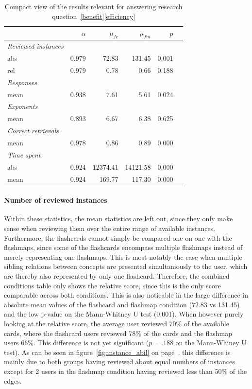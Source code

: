\begin{table}
    \centering
    \begin{tabular}{lrrrrr}
        \toprule
        & $\alpha$ & $\mu_{fc}$ & $\mu_{fm}$ & $p$ \\
        \midrule
        \emph{Reviewed instances} &&&& \\
        \midrule
        abs & 0.979 & 72.83 & 131.45 & 0.001 \\
        rel & 0.979 & 0.78 & 0.66 & 0.188 \\
        \midrule
        \emph{Responses} &&&& \\
        \midrule
        mean & 0.938 & 7.61 & 5.61 & 0.024 \\
        \midrule
        \multicolumn{5}{l}{\emph{Exponents}} \\
        \midrule
        mean & 0.893 & 6.67 & 6.38 & 0.625 \\
        \midrule
        \emph{Correct retrievals} &&&& \\
        \midrule
        mean & 0.978 & 0.86 & 0.89 & 0.000 \\
        \midrule
        \emph{Time spent} &&&& \\
        \midrule
        abs & 0.924 & 12374.41 & 14121.58 & 0.000 \\
        mean & 0.924 & 169.77 & 117.30 & 0.000 \\
        \bottomrule
    \end{tabular}
    \caption{Compact view of the results relevant for answering research question~\protect\ref{benefit}\protect\ref{efficiency}}
    \label{tab:efficiency}
\end{table}

\paragraph{Number of reviewed instances} Within these statistics, the mean statistics are left out, since they only make sense when reviewing them over the entire range of available instances. Furthermore, the flashcards cannot simply be compared one on one with the flashmaps, since some of the flashcards encompass multiple flashmaps instead of merely representing one flashmaps. This is most notably the case when multiple sibling relations between concepts are presented simultaniously to the user, which are thereby also represented by only one flashcard. Therefore, the combined conditions table only shows the relative score, since this is the only score comparable across both conditions. This is also noticable in the large difference in absolute mean values of the flashcard and flashmap condition (72.83 vs 131.45) and the low p-value on the Mann-Whitney U test (0.001). When however purely looking at the relative score, the average user reviewed 70\% of the available cards, where the flashcard users reviewed 78\% of the cards and the flashmap users 66\%. This difference is not yet significant ($p=.188$ on the Mann-Whiney U test). As can be seen in figure~\ref{fig:instance_abil} on page~\pageref{fig:instance_abil}, this difference is mainly due to both groups having reviewed about equal numbers of instances except for 2 users in the flashmap condition having reviewed less than 50\% of the edges.

